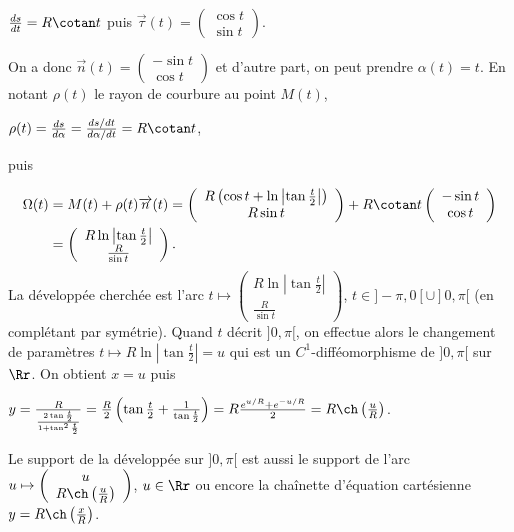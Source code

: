 {\begin{enumerate}
{\begin{center}
$\frac{ds}{dt}=R\cotan t$ puis $\overrightarrow{\tau}(t)=\left(
\begin{array}{c}
\cos t\\
\sin t
\end{array}
\right)$.
\end{center}
On a donc $\overrightarrow{n}(t)=\left(
\begin{array}{c}
-\sin  t\\
\cos t
\end{array}
\right)$ et d'autre part, on peut prendre $\alpha(t)=t$. En notant $\rho(t)$ le rayon de courbure au point $M(t)$,

\begin{center}
$\rho(t)=\frac{ds}{d\alpha}=\frac{ds/dt}{d\alpha/dt}=R\cotan t$,
\end{center}
puis

\begin{align*}\ensuremath
\Omega(t)&=M(t)+\rho(t)\overrightarrow{n}(t)=\left(
\begin{array}{c}
R\left(\cos t+\ln\left|\tan \frac{t}{2}\right|\right)\\
R\sin t
\end{array}
\right)+R\cotan t\left(
\begin{array}{c}
-\sin  t\\
\cos t
\end{array}
\right)\\
 &=\left(
\begin{array}{c}
R\ln\left|\tan \frac{t}{2}\right|\\
\frac{R}{\sin t}
\end{array}
\right).
\end{align*}
La développée cherchée est l'arc $t\mapsto\left(
\begin{array}{c}
R\ln\left|\tan \frac{t}{2}\right|\\
\frac{R}{\sin t}
\end{array}
\right)$, $t\in]-\pi,0[\cup]0,\pi[$ (en complétant par symétrie). Quand $t$ décrit $]0,\pi[$, on effectue alors le changement de paramètres $t\mapsto R\ln\left|\tan \frac{t}{2}\right|=u$ qui est un $C^1$-difféomorphisme de $]0,\pi[$ sur $\Rr$. On obtient $x=u$ puis

\begin{center}
$y=\frac{R}{\frac{2\tan\frac{t}{2}}{1+\tan^2\frac{t}{2}}}=\frac{R}{2}\left(\tan\frac{t}{2}+\frac{1}{\tan\frac{t}{2}}\right)=R\frac{e^{u/R}+e^{-u/R}}{2}=R\ch\left(\frac{u}{R}\right)$.
\end{center}
Le support de la développée sur $]0,\pi[$ est aussi le support de l'arc $u\mapsto\left(
\begin{array}{c}
u\\
R\ch\left(\frac{u}{R}\right)
\end{array}
\right)$, $u\in\Rr$ ou encore la chaînette d'équation cartésienne $y=R\ch\left(\frac{x}{R}\right)$.

}
\end{enumerate}}
